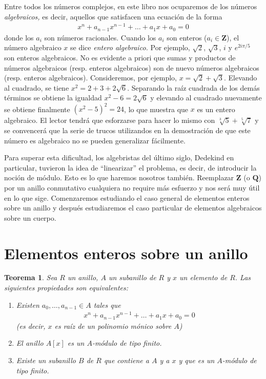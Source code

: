 \documentclass[oneside,bibtotoc,leqno,spanish]{amsbook}
\newcommand{\QQ}{\mathbf{Q}}
\newcommand{\ZZ}{\mathbf{Z}}
\numberwithin{equation}{section}
\theoremstyle{defi}
\theoremstyle{note}
\newtheorem{theorem}{Teorema}
\theoremstyle{rem}
\numberwithin{theorem}{section}
\numberwithin{proposition}{section}
\numberwithin{definition}{section}
\numberwithin{lemma}{section}
\numberwithin{corollary}{section}
\numberwithin{example}{section}
\numberwithin{footnote}{section}%
\begin{document}
Entre todos los n\'umeros complejos, en este libro nos ocuparemos de los n\'umeros
{\em algebraicos,} es decir, aquellos que satisfacen una ecuaci\'on de la forma
\begin{gather*}
x^{n}+a_{n-1}x^{n-1}+\dots+a_{1}x+a_{0} = 0
\end{gather*}
donde los $a_{i}$ son n\'umeros racionales. Cuando los $a_{i}$ son enteros
($a_{i}\in\ZZ$), el n\'umero algebraico $x$ se dice {\em entero algebraico.}
Por ejemplo, $\sqrt{2}$, $\sqrt{3}$, $i$ y $e^{2i\pi/5}$ son enteros algebraicos. No es evidente
a priori que sumas y productos de n\'umeros algebraicos (resp. enteros algebraicos) son
de nuevo n\'umeros algebraicos (resp. enteros algebraicos). Consideremos, por ejemplo,
$x = \sqrt{2}+\sqrt{3}$. Elevando al cuadrado, se tiene $x^{2} = 2+3+2\sqrt{6}$.
Separando la ra\'iz cuadrada de los dem\'as t\'erminos se obtiene la igualdad $x^{2}-6=2\sqrt{6}$ y
elevando al cuadrado nuevamente se obtiene finalmente $(x^{2}-5)^{2}=24$, lo que muestra que
$x$ es un entero algebraico. El lector tendr\'a que esforzarse para hacer lo mismo con
$\sqrt[3]{5}+\sqrt[5]{7}$ y se convencer\'a que la serie de trucos utilizandos en la demostraci\'on de
que este n\'umero es algebraico no se pueden generalizar f\'acilmente.

Para superar esta dificultad, los algebristas del \'ultimo siglo, Dedekind en particular, tuvieron
la idea de ``linearizar'' el problema, es decir, de introducir la noci\'on de m\'odulo. Esto es lo que haremos nosotros
tambi\'en. Reemplazar $\ZZ$ (o $\QQ$) por un anillo conmutativo cualquiera no require m\'as esfuerzo
y nos ser\'a muy \'util en lo que sige. Comenzaremos estudiando el caso general de elementos enteros sobre un
anillo y despu\'es estudiaremos el caso particular de elementos algebraicos sobre un cuerpo.

\section{Elementos enteros sobre un anillo}\label{sec2.1}

\begin{theorem}\label{teo2.1.1}
Sea $R$ un anillo, $A$ un subanillo de $R$ y $x$ un elemento de $R$. Las siguientes propiedades son equivalentes:
\begin{enumerate}
\item Existen $a_{0},\dots,a_{n-1}\in A$ tales que
\begin{gather}\label{eq-2.1-1}
x^{n}+a_{n-1}x^{n-1}+\dots+a_{1}x+a_{0} = 0
\end{gather}
(es decir, $x$ es ra\'iz de un polinomio m\'onico sobre $A$)
\item El anillo $A[x]$ es un $A$-m\'odulo de tipo finito.
\item Existe un subanillo $B$ de $R$ que contiene a $A$ y a $x$ y que es un $A$-m\'odulo
de tipo finito.
\end{enumerate}
\end{theorem}
\end{document}

